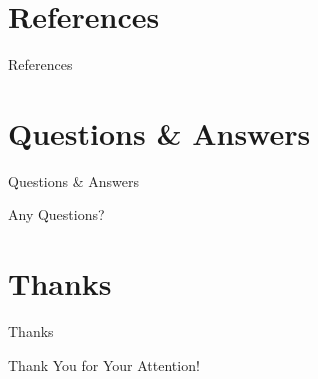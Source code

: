 \documentclass{beamer}
\begin{document}
\section{References}
\begin{frame}[shrink=20]{References}
    \nocite{*} 
    
    
\end{frame}

\section{Questions \& Answers}
\begin{frame}{Questions \& Answers}
  \begin{center}
    \Huge Any Questions?
  \end{center}
\end{frame}

\section{Thanks}
\begin{frame}{Thanks}
  \begin{center}
    \Huge Thank You for Your Attention!
  \end{center}
\end{frame}
\end{document}
